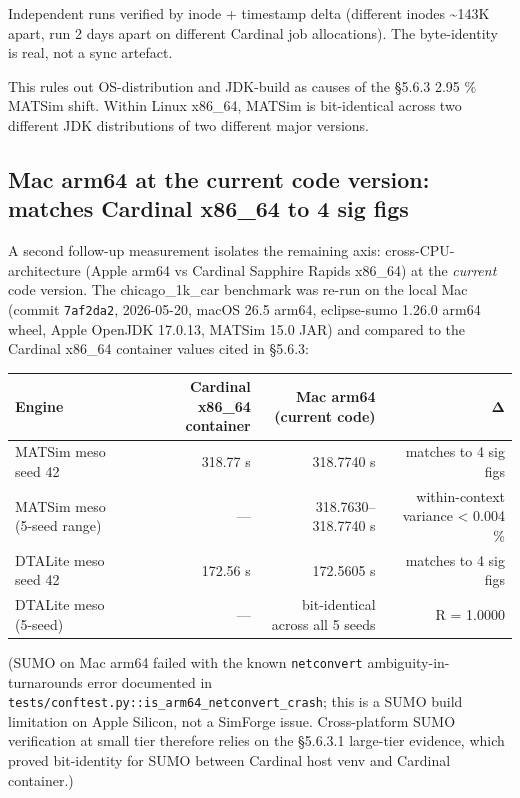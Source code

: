 Independent runs verified by inode + timestamp delta (different inodes
\textasciitilde143K apart, run 2 days apart on different Cardinal job
allocations). The byte-identity is real, not a sync artefact.

This rules out OS-distribution and JDK-build as causes of the §5.6.3
2.95 \% MATSim shift. Within Linux x86\_64, MATSim is bit-identical
across two different JDK distributions of two different major versions.

\subsection{Mac arm64 at the current code version: matches
Cardinal x86\_64 to 4 sig
figs}\label{5632-mac-arm64-at-the-current-code-version-matches-cardinal-x86_64-to-4-sig-figs}

A second follow-up measurement isolates the remaining axis:
cross-CPU-architecture (Apple arm64 vs Cardinal Sapphire Rapids x86\_64)
at the \emph{current} code version. The chicago\_1k\_car benchmark was
re-run on the local Mac (commit \texttt{7af2da2}, 2026-05-20, macOS 26.5
arm64, eclipse-sumo 1.26.0 arm64 wheel, Apple OpenJDK 17.0.13, MATSim
15.0 JAR) and compared to the Cardinal x86\_64 container values cited in
§5.6.3:

\begin{longtable}[]{@{}lrrr@{}}
\toprule\noalign{}
Engine & Cardinal x86\_64 container & Mac arm64 (current code) & Δ \\
\midrule\noalign{}
\endhead
\bottomrule\noalign{}
\endlastfoot
MATSim meso seed 42 & 318.77 s & 318.7740 s & matches to 4 sig figs \\
MATSim meso (5-seed range) & --- & 318.7630--318.7740 s & within-context
variance \textless{} 0.004 \% \\
DTALite meso seed 42 & 172.56 s & 172.5605 s & matches to 4 sig figs \\
DTALite meso (5-seed) & --- & bit-identical across all 5 seeds & R =
1.0000 \\
\end{longtable}

(SUMO on Mac arm64 failed with the known \texttt{netconvert}
ambiguity-in-turnarounds error documented in
\texttt{tests/conftest.py::is\_arm64\_netconvert\_crash}; this is a SUMO
build limitation on Apple Silicon, not a SimForge issue. Cross-platform
SUMO verification at small tier therefore relies on the §5.6.3.1
large-tier evidence, which proved bit-identity for SUMO between Cardinal
host venv and Cardinal container.)

